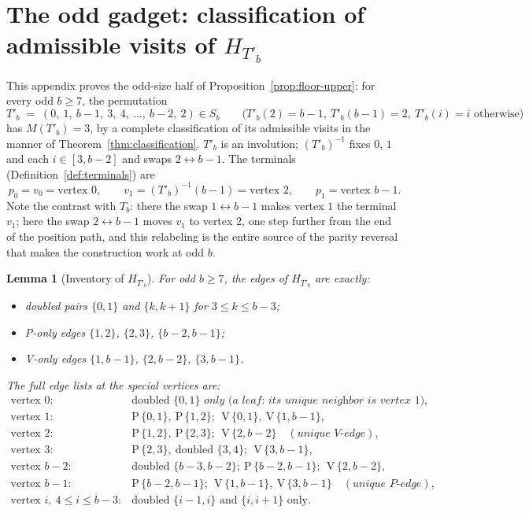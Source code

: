 \documentclass[11pt]{article}
\newtheorem{lemma}[theorem]{Lemma}
\theoremstyle{definition}
\newcommand{\inv}[1]{#1^{-1}}
\begin{document}
\section{The odd gadget: classification of admissible visits of
\texorpdfstring{$H_{T'_b}$}{H\_\{T'\_b\}}}\label{app:oddb}

This appendix proves the odd-size half of Proposition~\ref{prop:floor-upper}: for
every odd $b \ge 7$, the permutation
\[
T'_b \;=\; (0,\ 1,\ b{-}1,\ 3,\ 4,\ \dots,\ b{-}2,\ 2) \in S_b
\qquad
\bigl(T'_b(2) = b-1,\ T'_b(b-1) = 2,\ T'_b(i) = i \text{ otherwise}\bigr)
\]
has $M(T'_b) = 3$, by a complete classification of its admissible visits in the manner
of Theorem~\ref{thm:classification}. $T'_b$ is an involution;
$\inv{(T'_b)}$ fixes $0$, $1$ and each $i \in [3, b-2]$ and swaps
$2 \leftrightarrow b-1$. The terminals (Definition~\ref{def:terminals}) are
\[
p_0 = v_0 = \text{vertex } 0, \qquad v_1 = \inv{(T'_b)}(b-1) = \text{vertex } 2,
\qquad p_1 = \text{vertex } b-1 .
\]
Note the contrast with $T_b$: there the swap $1 \leftrightarrow b-1$ makes vertex $1$
the terminal $v_1$; here the swap $2 \leftrightarrow b-1$ moves $v_1$ to vertex $2$,
one step further from the end of the position path, and this relabeling is the entire
source of the parity reversal that makes the construction work at odd $b$.

\begin{lemma}[Inventory of $H_{T'_b}$]\label{lem:oddb-inventory}
For odd $b \ge 7$, the edges of $H_{T'_b}$ are exactly:
\begin{itemize}
\item \emph{doubled pairs} $\{0,1\}$ and $\{k, k+1\}$ for $3 \le k \le b-3$;
\item \emph{P-only edges} $\{1,2\}$, $\{2,3\}$, $\{b-2, b-1\}$;
\item \emph{V-only edges} $\{1, b-1\}$, $\{2, b-2\}$, $\{3, b-1\}$.
\end{itemize}
The full edge lists at the special vertices are:
\[
\begin{array}{ll}
\text{vertex } 0: & \text{doubled } \{0,1\} \textit{ only (a leaf: its unique
neighbor is vertex } 1\textit{)},\\[2pt]
\text{vertex } 1: & \mathrm P\,\{0,1\},\ \mathrm P\,\{1,2\};\ \ \mathrm V\,\{0,1\},\
\mathrm V\,\{1,b{-}1\},\\[2pt]
\text{vertex } 2: & \mathrm P\,\{1,2\},\ \mathrm P\,\{2,3\};\ \ \mathrm V\,\{2,b{-}2\}
\quad (\textit{unique V-edge}),\\[2pt]
\text{vertex } 3: & \mathrm P\,\{2,3\},\ \text{doubled } \{3,4\};\ \
\mathrm V\,\{3,b{-}1\},\\[2pt]
\text{vertex } b{-}2: & \text{doubled } \{b{-}3,b{-}2\};\ \mathrm P\,\{b{-}2,b{-}1\};\
\ \mathrm V\,\{2,b{-}2\},\\[2pt]
\text{vertex } b{-}1: & \mathrm P\,\{b{-}2,b{-}1\};\ \ \mathrm V\,\{1,b{-}1\},\
\mathrm V\,\{3,b{-}1\} \quad (\textit{unique P-edge}),\\[2pt]
\text{vertex } i,\ 4 \le i \le b-3: & \text{doubled } \{i{-}1,i\} \text{ and }
\{i,i{+}1\} \text{ only}.
\end{array}
\]
\end{lemma}
\end{document}
